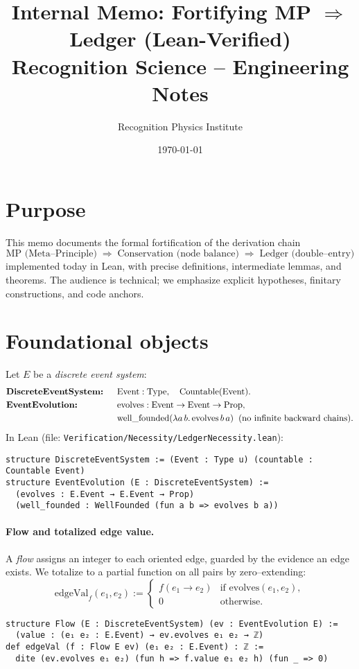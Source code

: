 \documentclass[11pt]{article}
\title{Internal Memo: Fortifying MP $\Rightarrow$ Ledger (Lean-Verified)\\[4pt]\normalsize Recognition Science – Engineering Notes}
\author{Recognition Physics Institute}
\date{\today}
\begin{document}
\maketitle

\section*{Purpose}
This memo documents the formal fortification of the derivation chain
\[
  \text{MP (Meta–Principle)} \;\Rightarrow\; \text{Conservation (node balance)} \;\Rightarrow\; \text{Ledger (double–entry)}
\]
implemented today in Lean, with precise definitions, intermediate lemmas, and theorems. The audience is technical; we emphasize explicit hypotheses, finitary constructions, and code anchors.

\section{Foundational objects}
Let $E$ be a \emph{discrete event system}:
\begin{align*}
  &\text{\bf DiscreteEventSystem:} &&\;\; \mathrm{Event} : \mathrm{Type}, \quad \mathrm{Countable}(\mathrm{Event}).\\
  &\text{\bf EventEvolution:} &&\;\; \mathrm{evolves} : \mathrm{Event} \to \mathrm{Event} \to \mathrm{Prop},\\
  &&&\;\; \text{well\_founded}(\lambda a\,b.\,\mathrm{evolves}\,b\,a) \;\;\text{(no infinite backward chains).}
\end{align*}
In Lean (file: \texttt{Verification/Necessity/LedgerNecessity.lean}):
\begin{verbatim}
structure DiscreteEventSystem := (Event : Type u) (countable : Countable Event)
structure EventEvolution (E : DiscreteEventSystem) :=
  (evolves : E.Event → E.Event → Prop)
  (well_founded : WellFounded (fun a b => evolves b a))
\end{verbatim}

\paragraph{Flow and totalized edge value.} A \emph{flow} assigns an integer to each oriented edge, guarded by the evidence an edge exists. We totalize to a partial function on all pairs by zero–extending:
\[
  \mathrm{edgeVal}_f(e_1,e_2) := \begin{cases}
    f(e_1\to e_2) & \text{if } \mathrm{evolves}(e_1,e_2),\\
    0 & \text{otherwise.}
  \end{cases}
\]
\begin{verbatim}
structure Flow (E : DiscreteEventSystem) (ev : EventEvolution E) :=
  (value : (e₁ e₂ : E.Event) → ev.evolves e₁ e₂ → ℤ)
def edgeVal (f : Flow E ev) (e₁ e₂ : E.Event) : ℤ :=
  dite (ev.evolves e₁ e₂) (fun h => f.value e₁ e₂ h) (fun _ => 0)
\end{verbatim}
\end{document}
